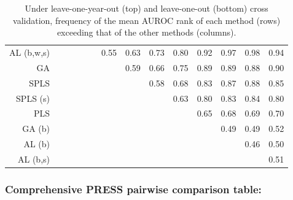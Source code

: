 \begin{table}[h!]
{\begin{tabular}{rccccccccccccc}
  AL (b,w,s) &  &  &  &  &  & 0.55 & 0.63 & 0.73 & 0.80 & 0.92 & 0.97 & 0.98 & 0.94 \\ 
  GA &  &  &  &  &  &  & 0.59 & 0.66 & 0.75 & 0.89 & 0.89 & 0.88 & 0.90 \\ 
  SPLS &  &  &  &  &  &  &  & 0.58 & 0.68 & 0.83 & 0.87 & 0.88 & 0.85 \\ 
  SPLS (s) &  &  &  &  &  &  &  &  & 0.63 & 0.80 & 0.83 & 0.84 & 0.80 \\ 
  PLS &  &  &  &  &  &  &  &  &  & 0.65 & 0.68 & 0.69 & 0.70 \\ 
  GA (b) &  &  &  &  &  &  &  &  &  &  & 0.49 & 0.49 & 0.52 \\ 
  AL (b) &  &  &  &  &  &  &  &  &  &  &  & 0.46 & 0.50 \\ 
  AL (b,s) &  &  &  &  &  &  &  &  &  &  &  &  & 0.51 \\ 
  
    \end{tabular}}
    \caption{Under leave-one-year-out (top) and leave-one-out (bottom) cross validation, frequency of the mean AUROC rank of each method (rows) exceeding that of the other methods (columns).
    \label{tab:AUROC-comprehensive}}
\end{table}

\subsubsection{Comprehensive PRESS pairwise comparison
table:}\label{comprehensive-press-pairwise-comparison-table}

